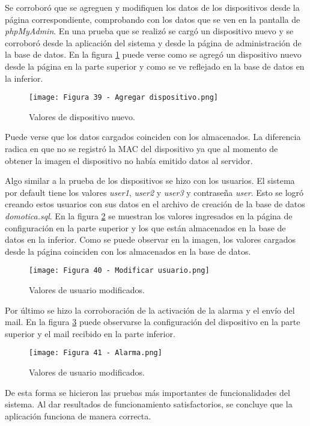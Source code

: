 Se corroboró que se agreguen y modifiquen los datos de los dispositivos desde la página correspondiente, comprobando con los datos que se ven en la pantalla de \textit{phpMyAdmin}. En una prueba que se realizó se cargó un dispositivo nuevo y se corroboró desde la aplicación del sistema y desde la página de administración de la base de datos. En la figura \ref{fig:39} puede verse como se agregó un dispositivo nuevo desde la página en la parte superior y como se ve reflejado en la base de datos en la inferior.

\begin{figure}[h]
\centering
\texttt{[image: Figura 39 - Agregar dispositivo.png]}
\caption[Agregar dispositivo]{Valores de dispositivo nuevo.}
\label{fig:39}
\end{figure}

Puede verse que los datos cargados coinciden con los almacenados. La diferencia radica en que no se registró la MAC del dispositivo ya que al momento de obtener la imagen el dispositivo no había emitido datos al servidor.

Algo similar a la prueba de los dispositivos se hizo con los usuarios. El sistema por default tiene los valores \textit{user1}, \textit{user2} y \textit{user3} y contraseña \textit{user}. Esto se logró creando estos usuarios con sus datos en el archivo de creación de la base de datos \textit{domotica.sql}. En la figura \ref{fig:40} se muestran los valores ingresados en la página de configuración en la parte superior y los que están almacenados en la base de datos en la inferior. Como se puede observar en la imagen, los valores cargados desde la página coinciden con los almacenados en la base de datos.

\begin{figure}[h]
\centering
\texttt{[image: Figura 40 - Modificar usuario.png]}
\caption[Cambiar usuario]{Valores de usuario modificados.}
\label{fig:40}
\end{figure}

Por último se hizo la corroboración de la activación de la alarma y el envío del mail. En la figura \ref{fig:41} puede observarse la configuración del dispositivo en la parte superior y el mail recibido en la parte inferior.
\newpage
\begin{figure}[h]
\centering
\texttt{[image: Figura 41 - Alarma.png]}
\caption[Cambiar usuario]{Valores de usuario modificados.}
\label{fig:41}
\end{figure}

De esta forma se hicieron las pruebas más importantes de funcionalidades del sistema. Al dar resultados de funcionamiento satisfactorios, se concluye que la aplicación funciona de manera correcta.

